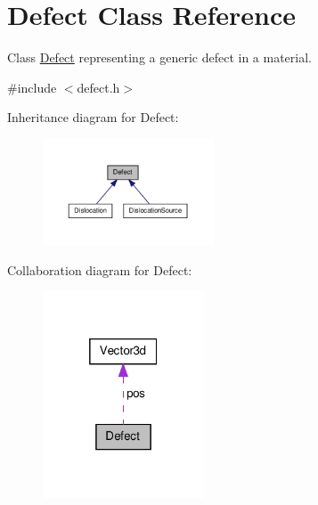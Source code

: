 \hypertarget{classDefect}{\section{\-Defect \-Class \-Reference}
\label{d5/d4f/classDefect}
}


\-Class \hyperlink{classDefect}{\-Defect} representing a generic defect in a material.  




{\ttfamily \#include $<$defect.\-h$>$}



\-Inheritance diagram for \-Defect\-:\nopagebreak
\begin{figure}[H]
\begin{center}
\leavevmode
\includegraphics[width=144pt]{de/d48/classDefect__inherit__graph}
\end{center}
\end{figure}


\-Collaboration diagram for \-Defect\-:\nopagebreak
\begin{figure}[H]
\begin{center}
\leavevmode
\includegraphics[width=136pt]{d7/d09/classDefect__coll__graph}
\end{center}
\end{figure}
